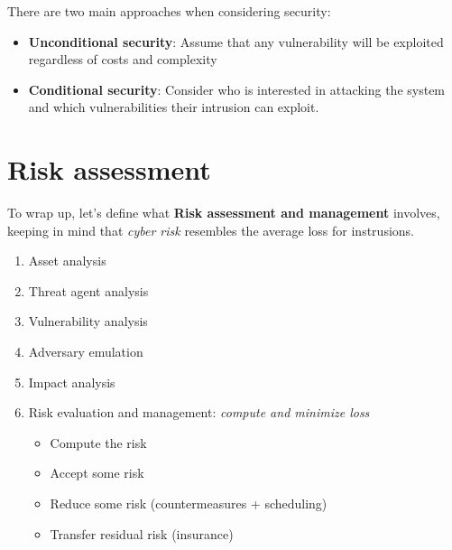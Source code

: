 There are two main approaches when considering security:
\begin{itemize}
    \item \textbf{Unconditional security}: Assume that any vulnerability will be exploited regardless of costs and complexity
    \item \textbf{Conditional security}: Consider who is interested in attacking the system and which vulnerabilities their intrusion can exploit. 
\end{itemize}

\section{Risk assessment}
To wrap up, let's define what \textbf{Risk assessment and management} involves,
keeping in mind that \textit{cyber risk} resembles the average loss for instrusions.
\begin{enumerate}
    \item Asset analysis
    \item Threat agent analysis
    \item Vulnerability analysis
    \item Adversary emulation
    \item Impact analysis
    \item Risk evaluation and management: \textit{compute and minimize loss}
    \begin{itemize}
        \item Compute the risk
        \item Accept some risk
        \item Reduce some risk (countermeasures + scheduling)
        \item Transfer residual risk (insurance)
    \end{itemize}
\end{enumerate}